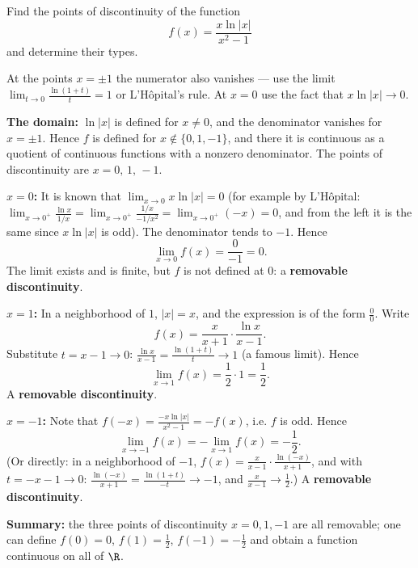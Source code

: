 
\begin{question}
Find the points of discontinuity of the function
\[ f(x)=\frac{x\ln|x|}{x^2-1} \]
and determine their types.
\end{question}

\begin{hint}
At the points $x=\pm1$ the numerator also vanishes — use the limit $\lim_{t\to0}\frac{\ln(1+t)}{t}=1$ or L'Hôpital's rule. At $x=0$ use the fact that $x\ln|x|\to0$.
\end{hint}

\begin{solution}
\textbf{The domain:} $\ln|x|$ is defined for $x\neq0$, and the denominator vanishes for $x=\pm1$. Hence $f$ is defined for $x\notin\{0,1,-1\}$, and there it is continuous as a quotient of continuous functions with a nonzero denominator. The points of discontinuity are $x=0,\,1,\,-1$.

\textbf{$x=0$:} It is known that $\lim_{x\to0}x\ln|x|=0$ (for example by L'Hôpital: $\lim_{x\to0^+}\frac{\ln x}{1/x}=\lim_{x\to0^+}\frac{1/x}{-1/x^2}=\lim_{x\to0^+}(-x)=0$, and from the left it is the same since $x\ln|x|$ is odd). The denominator tends to $-1$. Hence
\[ \lim_{x\to0}f(x)=\frac{0}{-1}=0. \]
The limit exists and is finite, but $f$ is not defined at $0$: a \textbf{removable discontinuity}.

\textbf{$x=1$:} In a neighborhood of $1$, $|x|=x$, and the expression is of the form $\frac00$. Write
\[ f(x)=\frac{x}{x+1}\cdot\frac{\ln x}{x-1}. \]
Substitute $t=x-1\to0$: $\frac{\ln x}{x-1}=\frac{\ln(1+t)}{t}\to1$ (a famous limit). Hence
\[ \lim_{x\to1}f(x)=\frac{1}{2}\cdot1=\frac12. \]
A \textbf{removable discontinuity}.

\textbf{$x=-1$:} Note that $f(-x)=\frac{-x\ln|x|}{x^2-1}=-f(x)$, i.e. $f$ is odd. Hence
\[ \lim_{x\to-1}f(x)=-\lim_{x\to1}f(x)=-\frac12. \]
(Or directly: in a neighborhood of $-1$, $f(x)=\frac{x}{x-1}\cdot\frac{\ln(-x)}{x+1}$, and with $t=-x-1\to0$: $\frac{\ln(-x)}{x+1}=\frac{\ln(1+t)}{-t}\to-1$, and $\frac{x}{x-1}\to\frac12$.)
A \textbf{removable discontinuity}.

\textbf{Summary:} the three points of discontinuity $x=0,1,-1$ are all removable; one can define $f(0)=0$, $f(1)=\frac12$, $f(-1)=-\frac12$ and obtain a function continuous on all of $\R$.
\end{solution}
